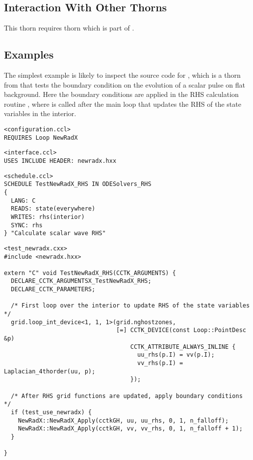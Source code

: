 \subsection{Interaction With Other Thorns}
This thorn requires thorn  which is part of
.

\subsection{Examples}
The simplest example is likely to inspect the source code for
, which is a thorn from  that tests the
boundary condition on the evolution of a scalar pulse on flat background.
Here the boundary conditions are applied in the RHS calculation routine
, where  is called after the main
loop that updates the RHS of the state variables in the interior.

\begin{verbatim}
<configuration.ccl>
REQUIRES Loop NewRadX
\end{verbatim}

\begin{verbatim}
<interface.ccl>
USES INCLUDE HEADER: newradx.hxx
\end{verbatim}

\begin{verbatim}
<schedule.ccl>
SCHEDULE TestNewRadX_RHS IN ODESolvers_RHS
{
  LANG: C
  READS: state(everywhere)
  WRITES: rhs(interior)
  SYNC: rhs
} "Calculate scalar wave RHS"
\end{verbatim}

\begin{verbatim}
<test_newradx.cxx>
#include <newradx.hxx>

extern "C" void TestNewRadX_RHS(CCTK_ARGUMENTS) {
  DECLARE_CCTK_ARGUMENTSX_TestNewRadX_RHS;
  DECLARE_CCTK_PARAMETERS;

  /* First loop over the interior to update RHS of the state variables */
  grid.loop_int_device<1, 1, 1>(grid.nghostzones,
                                [=] CCTK_DEVICE(const Loop::PointDesc &p)
                                    CCTK_ATTRIBUTE_ALWAYS_INLINE {
                                      uu_rhs(p.I) = vv(p.I);
                                      vv_rhs(p.I) = Laplacian_4thorder(uu, p);
                                    });

  /* After RHS grid functions are updated, apply boundary conditions */
  if (test_use_newradx) {
    NewRadX::NewRadX_Apply(cctkGH, uu, uu_rhs, 0, 1, n_falloff);
    NewRadX::NewRadX_Apply(cctkGH, vv, vv_rhs, 0, 1, n_falloff + 1);
  }

}
\end{verbatim}


